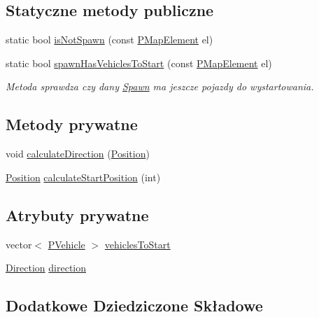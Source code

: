 \subsection*{Statyczne metody publiczne}
\begin{DoxyCompactItemize}
\item 
static bool \hyperlink{class_spawn_abe804575f38e55324e413283898b5d57}{is\-Not\-Spawn} (const \hyperlink{_types_8h_a4260a5280323637f8a1fa28e89b6ef14}{P\-Map\-Element} el)
\item 
static bool \hyperlink{class_spawn_a488b20e9deeebe095670804599a3ddc9}{spawn\-Has\-Vehicles\-To\-Start} (const \hyperlink{_types_8h_a4260a5280323637f8a1fa28e89b6ef14}{P\-Map\-Element} el)
\begin{DoxyCompactList}\small\item\em Metoda sprawdza czy dany \hyperlink{class_spawn}{Spawn} ma jeszcze pojazdy do wystartowania. \end{DoxyCompactList}\end{DoxyCompactItemize}
\subsection*{Metody prywatne}
\begin{DoxyCompactItemize}
\item 
void \hyperlink{class_spawn_aece1dda8039ac307dd9bfdf9c47fb1c0}{calculate\-Direction} (\hyperlink{struct_position}{Position})
\item 
\hyperlink{struct_position}{Position} \hyperlink{class_spawn_a9dd0bae055d82dba2d95c0fab52d14f7}{calculate\-Start\-Position} (int)
\end{DoxyCompactItemize}
\subsection*{Atrybuty prywatne}
\begin{DoxyCompactItemize}
\item 
vector$<$ \hyperlink{_types_8h_a564207d327881e8bcfa0843e1a874756}{P\-Vehicle} $>$ \hyperlink{class_spawn_a9796373f175f911096daa7ffda1186ea}{vehicles\-To\-Start}
\item 
\hyperlink{_direction_8h_a224b9163917ac32fc95a60d8c1eec3aa}{Direction} \hyperlink{class_spawn_a593c6fb8ae012980751c4364b8ebb5b5}{direction}
\end{DoxyCompactItemize}
\subsection*{Dodatkowe Dziedziczone Składowe}


